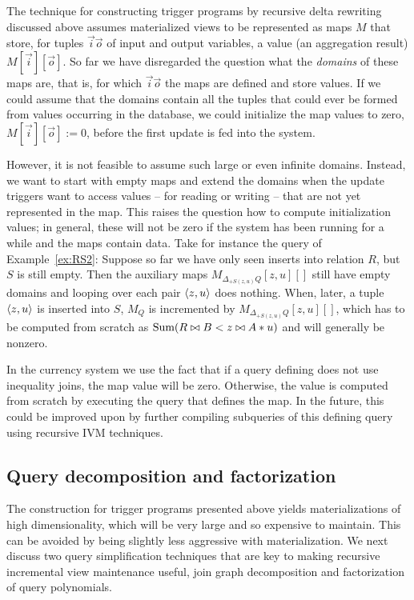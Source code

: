 The technique for constructing trigger programs by recursive delta rewriting discussed above assumes
materialized views to be represented as maps $M$ that store, for tuples $\vec{i}\vec{o}$ of input and output variables, a value (an aggregation result) $M[\vec{i}][\vec{o}]$.
So far we have disregarded the question what the {\em domains} of these maps are, that is,
for which $\vec{i}\vec{o}$ the maps are defined and store values.
If we could assume that the domains contain all the tuples that could ever be formed from values occurring
in the database, we could initialize the map values to zero, $M[\vec{i}][\vec{o}] := 0$,
before the first update is fed into the system.

However, it is not feasible to assume such large or even infinite domains.
Instead, we want to start with empty maps and extend the domains when the update triggers want to access
values -- for reading or writing -- that are not yet represented in the map.
This raises the question how to compute initialization values; in general, these will not be zero if 
the system has been running for a while and the maps contain data.
Take for instance the query of Example~\ref{ex:RS2}: Suppose so far we have only seen inserts into relation $R$,
but $S$ is still empty. Then the auxiliary maps $M_{\Delta_{+S(z,u)} Q}[z,u][]$ still have empty domains and
looping over each pair ${\langle z,u\rangle}$ does nothing. When, later, a tuple ${\langle z,u\rangle}$ is inserted into $S$,
$M_Q$ is incremented by $M_{\Delta_{+S(z,u)} Q}[z,u][]$, which has to be computed from scratch as
$\mbox{Sum}(R \bowtie B < z \bowtie A*u)$ and will generally be nonzero.

In the currency system we use the fact that if a query defining does not use inequality joins, the map value
will be zero. Otherwise, the value is computed from scratch by executing the query that defines the map.
In the future, this could be improved upon by further compiling subqueries of this defining query using
recursive IVM techniques.


\subsection{Query decomposition and factorization}
\label{sec:simplification}


The construction for trigger programs presented above yields 
materializations of high dimensionality, which will be very large and so expensive to maintain.
This can be avoided by being slightly less aggressive with materialization.
We next discuss two query simplification techniques that are key to making
recursive incremental view maintenance useful, join graph decomposition and factorization
of query polynomials.


